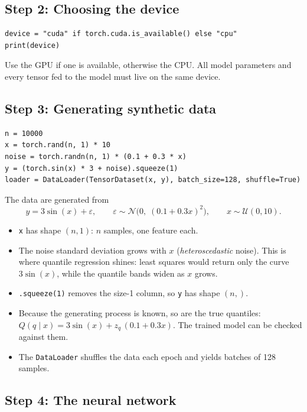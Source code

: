\documentclass[11pt]{article}
\begin{document}
\subsection{Step 2: Choosing the device}

\begin{lstlisting}
device = "cuda" if torch.cuda.is_available() else "cpu"
print(device)
\end{lstlisting}

Use the GPU if one is available, otherwise the CPU. All model parameters and
every tensor fed to the model must live on the same device.

\subsection{Step 3: Generating synthetic data}

\begin{lstlisting}
n = 10000
x = torch.rand(n, 1) * 10
noise = torch.randn(n, 1) * (0.1 + 0.3 * x)
y = (torch.sin(x) * 3 + noise).squeeze(1)
loader = DataLoader(TensorDataset(x, y), batch_size=128, shuffle=True)
\end{lstlisting}

The data are generated from
\[
  y = 3\sin(x) + \varepsilon, \qquad
  \varepsilon \sim \mathcal{N}\!\big(0,\; (0.1 + 0.3x)^2\big), \qquad
  x \sim \mathcal{U}(0, 10).
\]

\begin{itemize}
  \item \texttt{x} has shape $(n, 1)$: $n$ samples, one feature each.
  \item The noise standard deviation grows with $x$ (\emph{heteroscedastic}
        noise). This is where quantile regression shines: least squares would
        return only the curve $3\sin(x)$, while the quantile bands widen as
        $x$ grows.
  \item \texttt{.squeeze(1)} removes the size-1 column, so \texttt{y} has shape $(n,)$.
  \item Because the generating process is known, so are the true quantiles:
        $Q(q \mid x) = 3\sin(x) + z_q\,(0.1 + 0.3x)$. The trained model can be
        checked against them.
  \item The \texttt{DataLoader} shuffles the data each epoch and yields
        batches of 128 samples.
\end{itemize}

\subsection{Step 4: The neural network}
\end{document}
